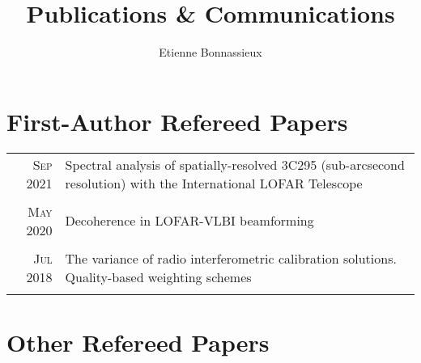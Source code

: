 \documentclass[11pt,a4paper,notitlepage]{article}
\author{Etienne Bonnassieux}
\title{Publications \& Communications}
\date{}
\begin{document}
\maketitle

\section{First-Author Refereed Papers}

\begin{tabular}{r|p{12.5cm}}
	
	\textsc{Sep 2021} & Spectral analysis of spatially-resolved 3C295 (sub-arcsecond resolution) with the International LOFAR Telescope \citep{2021arXiv210807294B}\\
	\multicolumn{2}{c}{} \\
	
	\textsc{May 2020} & Decoherence in LOFAR-VLBI beamforming \citep{2020AA...637A..51B}\\
	\multicolumn{2}{c}{} \\
	
	\textsc{Jul 2018} & The variance of radio interferometric calibration solutions. Quality-based weighting schemes \citep{2018AA...615A..66B}\\
	\multicolumn{2}{c}{} \\
	
\end{tabular}


\section{Other Refereed Papers}
\end{document}
